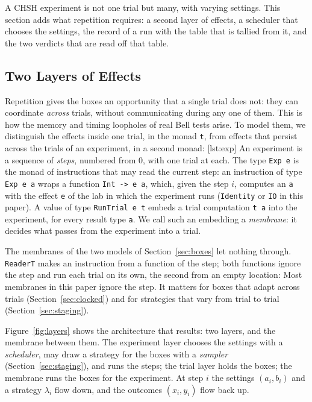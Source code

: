 \documentclass[11pt]{article}
\newcommand{\hs}{\lstinline[style=hask,basicstyle=\ttfamily,frame=none]}
\begin{document}
A CHSH experiment is not one trial but many, with varying settings. This section adds what repetition requires: a second layer of effects, a scheduler that chooses the settings, the record of a run with the table that is tallied from it, and the two verdicts that are read off that table.

\subsection{Two Layers of Effects}\label{sec:layers}

Repetition gives the boxes an opportunity that a single trial does not: they can coordinate \emph{across} trials, without communicating during any one of them. This is how the memory and timing loopholes of real Bell tests arise. To model them, we distinguish the effects inside one trial, in the monad \hs|t|, from effects that persist across the trials of an experiment, in a second monad:
[lst:exp]
An experiment is a sequence of \emph{steps}, numbered from $0$, with one trial at each. The type \hs|Exp e| is the monad of instructions that may read the current step: an instruction of type \hs|Exp e a| wraps a function \hs|Int -> e a|, which, given the step $i$, computes an \hs|a| with the effect \hs|e| of the lab in which the experiment runs (\hs|Identity| or \hs|IO| in this paper). A value of type \hs|RunTrial e t| embeds a trial computation \hs|t a| into the experiment, for every result type \hs|a|. We call such an embedding a \emph{membrane}: it decides what passes from the experiment into a trial.

The membranes of the two models of Section~\ref{sec:boxes} let nothing through. \hs|ReaderT| makes an instruction from a function of the step; both functions ignore the step and run each trial on its own, the second from an empty location:
Most membranes in this paper ignore the step. It matters for boxes that adapt across trials (Section~\ref{sec:clocked}) and for strategies that vary from trial to trial (Section~\ref{sec:staging}).

Figure~\ref{fig:layers} shows the architecture that results: two layers, and the membrane between them. The experiment layer chooses the settings with a \emph{scheduler}, may draw a strategy for the boxes with a \emph{sampler} (Section~\ref{sec:staging}), and runs the steps; the trial layer holds the boxes; the membrane runs the boxes for the experiment. At step $i$ the settings $(a_i, b_i)$ and a strategy $\lambda_i$ flow down, and the outcomes $(x_i, y_i)$ flow back up.
\end{document}
